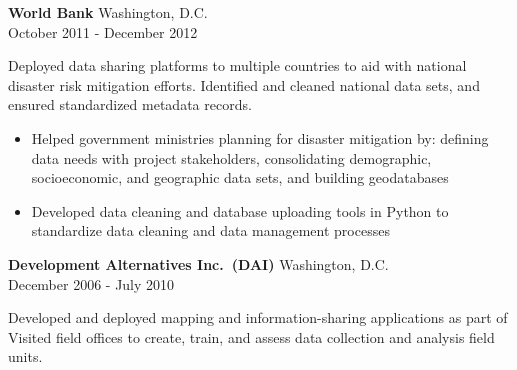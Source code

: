 \documentclass[letterpaper]{article}
\begin{document}
\textbf{World Bank} 
    \hfill Washington, D.C.\\
    \hfill October 2011 - December 2012\\
\vspace{1mm}

Deployed  data sharing platforms to multiple countries to
aid with national disaster risk mitigation efforts. Identified and cleaned
national data sets, and ensured standardized metadata records.

\vspace{-1mm}
\begin{itemize} \itemsep 0pt
    \item Helped government ministries planning for disaster mitigation by:
    defining data needs with project stakeholders, consolidating demographic,
    socioeconomic, and geographic data sets, and building 
    geodatabases
    
    \item Developed data cleaning and database uploading tools in Python to 
    standardize data cleaning and data management processes
\end{itemize}


\textbf{Development Alternatives Inc.~(DAI)} 
    \hfill Washington, D.C.\\
    \hfill December 2006 - July 2010\\
\vspace{1mm}

Developed and deployed mapping and information-sharing applications as part of
Visited field offices to create, train, and assess data collection and analysis
field units.
\end{document}
